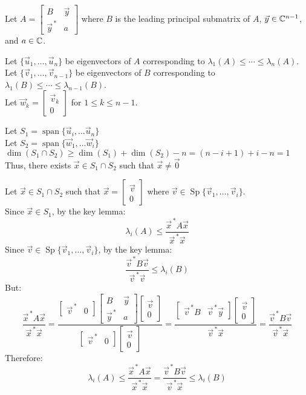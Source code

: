 \documentclass[letterpaper,12pt,fleqn]{article}
\newcommand{\vx}{\vec{x}}
\newcommand{\vxct}{\vx^{\,*}}
\newcommand{\vy}{\vec{y}}
\newcommand{\vyct}{\vy^{\,*}}
\newcommand{\vu}{\vec{u}}
\newcommand{\vv}{\vec{v}}
\newcommand{\vvct}{\vv^{\,*}}
\newcommand{\vw}{\vec{w}}
\newcommand{\vz}{\vec{0}}
\renewcommand{\l}{\lambda}
\DeclareMathOperator{\Sp}{Sp}
\DeclareMathOperator{\spn}{span}
\begin{document}
\begin{theproof}
  Let $A=\begin{bmatrix} B & \vy \\ \vyct & a \end{bmatrix}$ where $B$ is the leading
  principal submatrix of $A$, $\vy\in\C^{n-1}$, and $a\in\mathbb{C}$.

  Let $\{\vu_1,\ldots,\vu_n\}$ be eigenvectors of $A$ corresponding to
  $\l_1(A)\le\cdots\le\l_n(A)$. \\
  Let $\{\vv_1,\ldots,\vv_{n-1}\}$ be eigenvectors of $B$ corresponding to
  $\l_1(B)\le\cdots\le\l_{n-1}(B)$. \\
  Let $\vw_k=\begin{bmatrix} \vv_k \\ 0 \end{bmatrix}$ for $1\le k\le n-1$.

  Let $S_1=\spn\{\vu_i,\ldots\vu_n\}$ \\
  Let $S_2=\spn\{\vw_1,\ldots\vw_i\}$ \\
  $\dim(S_1\cap S_2)\ge\dim(S_1)+\dim(S_2)-n=(n-i+1)+i-n=1$ \\
  Thus, there exists $\vx\in S_1\cap S_2$ such that $\vx\ne\vz$

  Let $\vx\in S_1\cap S_2$ such that $\vx=\begin{bmatrix} \vv \\ 0 \end{bmatrix}$ where
  $\vv\in\Sp\{\vv_1,\ldots,\vv_i\}$. \\
  Since $\vx\in S_1$, by the key lemma:
  \[\l_i(A)\le\frac{\vxct A\vx}{\vxct\vx}\]
  Since $\vv\in\Sp\{\vv_1,\ldots,\vv_i\}$, by the key lemma:
  \[\frac{\vvct B\vv}{\vvct\vv}\le\l_i(B)\]
  But:
  \[\frac{\vxct A\vx}{\vxct\vx}=
  \frac{\begin{bmatrix} \vvct & 0 \end{bmatrix}
    \begin{bmatrix} B & \vy \\ \vyct & a \end{bmatrix}
    \begin{bmatrix} \vv \\ 0 \end{bmatrix}
  }{\begin{bmatrix} \vvct & 0 \end{bmatrix}\begin{bmatrix} \vv \\ 0 \end{bmatrix}}=
  \frac{\begin{bmatrix} \vvct B & \vvct\vy \end{bmatrix}
    \begin{bmatrix} \vv \\ 0 \end{bmatrix}
  }{\vvct\vx}=
  \frac{\vvct B\vv}{\vvct\vx}
  \]
  Therefore:
  \[\l_i(A)\le\frac{\vxct A\vx}{\vxct\vx}=\frac{\vvct B\vv}{\vvct\vx}\le\l_i(B)\]


\end{theproof}
\end{document}

